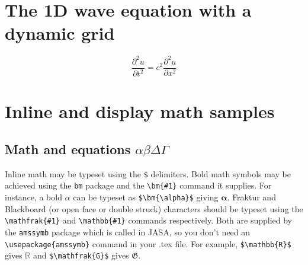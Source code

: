 \documentclass[reprint]{JASA}
\begin{document}

\section{\label{sec:2} The 1D wave equation with a dynamic grid}

\begin{equation}
    \frac{\partial^2 u}{\partial t^2}= c^2\frac{\partial^2 u}{\partial x^2}
\end{equation}







\section{Inline and display math samples\label{sec:3}}

\subsection{\label{subsec:3:3} Math and equations $\alpha\beta\Delta\Gamma$}
Inline math may be typeset using the \verb+$+ delimiters. Bold math
symbols may be achieved using the \verb+bm+ package and the
\verb+\bm{#1}+ command it supplies. For instance, a bold $\alpha$ can
be typeset as \verb+$\bm{\alpha}$+ giving $\bm{\alpha}$. Fraktur and
Blackboard (or open face or double struck) characters should be
typeset using the \verb+\mathfrak{#1}+ and \verb+\mathbb{#1}+ commands
respectively. Both are supplied by the \texttt{amssymb} package which
is called in JASA, so you don't need an \verb+\usepackage{amssymb}+
command in your .tex file. For
example, \verb+$\mathbb{R}$+ gives $\mathbb{R}$ and
\verb+$\mathfrak{G}$+ gives $\mathfrak{G}$.
\end{document}
